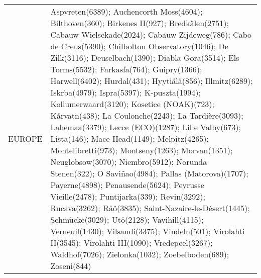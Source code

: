 \documentclass[journal abbreviation, manuscript]{copernicus}
\begin{document}
\begin{table}
\begin{tabularx}{\textwidth}{lX}
   EUROPE &                                                                                                                                                                                                                                                                                                                                                                                                                                                                                                                                                                                                                                                                                                                                                                                                                                                                                                                                                                                                                                                                                                                                                                                                                                                                                                                                                                                                                                                                                                                                                                                                                                                                                                                                                                                                                               Aspvreten(6389); Auchencorth Moss(4604); Bilthoven(360); Birkenes II(927); Bredkälen(2751); Cabauw Wielsekade(2024); Cabauw Zijdeweg(786); Cabo de Creus(5390); Chilbolton Observatory(1046); De Zilk(3116); Deuselbach(1390); Diabla Gora(3514); Els Torms(5532); Farkasfa(764); Guipry(1366); Harwell(6402); Hurdal(431); Hyytiälä(856); Illmitz(6289); Iskrba(4979); Ispra(5397); K-puszta(1994); Kollumerwaard(3120); Kosetice (NOAK)(723); Kårvatn(438); La Coulonche(2243); La Tardière(3093); Lahemaa(3379); Lecce (ECO)(1287); Lille Valby(673); Lista(146); Mace Head(1149); Melpitz(4265); Montelibretti(973); Montseny(1263); Morvan(1351); Neuglobsow(3070); Niembro(5912); Norunda Stenen(322); O Saviñao(4984); Pallas (Matorova)(1707); Payerne(4898); Penausende(5624); Peyrusse Vieille(2478); Puntijarka(339); Revin(3292); Rucava(3262); Råö(3835); Saint-Nazaire-le-Désert(1445); Schmücke(3029); Utö(2128); Vavihill(4115); Verneuil(1430); Vilsandi(3375); Vindeln(501); Virolahti II(3545); Virolahti III(1090); Vredepeel(3267); Waldhof(7026); Zielonka(1032); Zoebelboden(689); Zoseni(844) \\

\end{tabularx}
\end{table}
\end{document}
